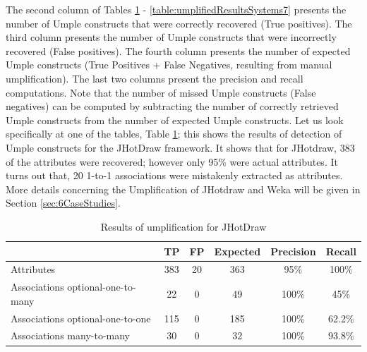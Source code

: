 

The second column of Tables \ref{table:umplifiedResultsSystems1} - \ref{table:umplifiedResultsSystems7} presents the number of Umple constructs that were correctly recovered (True positives). The third column presents the number of Umple constructs that were incorrectly recovered (False positives). The fourth column presents the number of expected Umple constructs (True Positives + False Negatives, resulting from manual umplification). The last two columns present the precision and recall computations. Note that the number of missed Umple constructs (False negatives) can be computed by subtracting the number of correctly retrieved Umple constructs from the number of expected Umple constructs. 
Let us look specifically at one of the tables, Table \ref{table:umplifiedResultsSystems1}; this shows the results of detection of Umple constructs for the JHotDraw framework.  It shows that for JHotdraw, 383 of the attributes were recovered; however only 95\% were actual attributes. It turns out that, 20 1-to-1 associations were mistakenly extracted as attributes. More details concerning the Umplification of JHotdraw and Weka will be given in Section \ref{sec:6CaseStudies}.

\begin{table}[h]
\caption{Results of umplification for JHotDraw}
\label{table:umplifiedResultsSystems1}
\centering 
\begin{tabularx}{\textwidth}{l|ccccc}
\toprule
\rowcolor[HTML]{BBDAFF}
\textbf{} & \textbf{TP}  & \textbf{FP} & \textbf{Expected} & \textbf{Precision}  & \textbf{Recall}\\ \hline
Attributes & 383  & 20  & 363  & 95\% & 100\% \\ \hline
Associations optional-one-to-many &  22 & 0 & 49 & 100\% & 45\% \\
Associations optional-one-to-one &  115 & 0 & 185  & 100\% & 62.2\% \\ 
Associations many-to-many & 30 & 0 & 32 & 100\% & 93.8\%\\ 
\end{tabularx}
\end{table}

